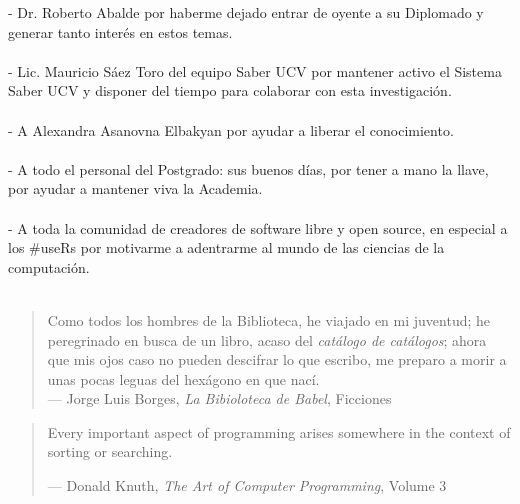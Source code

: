 \documentclass[
  12pt,
  openany]{book}
\begin{document}
- Dr. Roberto Abalde por haberme dejado entrar de oyente a su Diplomado y generar tanto interés en estos temas.\\\\
- Lic. Mauricio Sáez Toro del equipo Saber UCV por mantener activo el Sistema Saber UCV y disponer del tiempo para colaborar con esta investigación.\\\\
- A Alexandra Asanovna Elbakyan por ayudar a liberar el conocimiento.\\\\
- A todo el personal del Postgrado: sus buenos días, por tener a mano la llave, por ayudar a mantener viva la Academia.\\\\
- A toda la comunidad de creadores de software libre y open source, en especial a los \#useRs por motivarme a adentrarme al mundo de las ciencias de la computación.\\\\


\newpage
\thispagestyle{empty}
\vspace*{5cm}
\hfill
\begin{minipage}{0.70\textwidth}
\begin{quote}
Como todos los hombres de la Biblioteca, he viajado en mi juventud; he peregrinado en busca de un libro, acaso del \emph{catálogo de catálogos}; ahora que mis ojos caso no pueden descifrar lo que escribo, me preparo a morir a unas pocas leguas del hexágono en que nací.\\
--- Jorge Luis Borges, \textit{La Bibioloteca de Babel}, Ficciones
\end{quote}
\hspace*{2cm}

\begin{quote}
Every important aspect of programming arises somewhere in the context of sorting or searching.

--- Donald Knuth, \textit{The Art of Computer Programming}, Volume 3
\end{quote}
\end{minipage}

\thispagestyle{empty}
\maketitle



{
\setcounter{tocdepth}{2}
\tableofcontents
}
\listoffigures
\listoftables
\clearpage
{}
\end{document}

